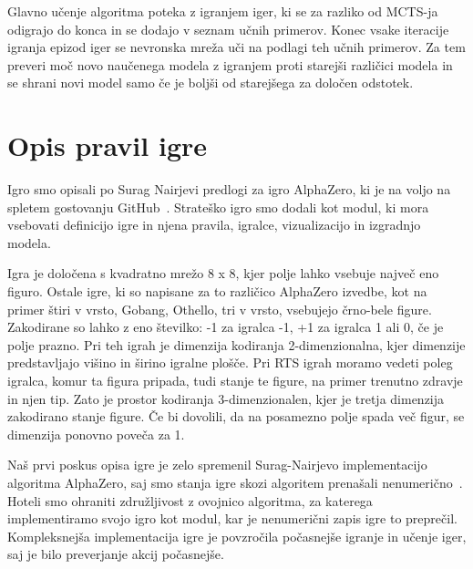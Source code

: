 \documentclass[a4paper, 12pt]{book}
\begin{document}
Glavno učenje algoritma poteka z igranjem iger, ki se za razliko od MCTS-ja odigrajo do konca in se dodajo v seznam učnih primerov.
Konec vsake iteracije igranja epizod iger se nevronska mreža uči na podlagi teh učnih primerov.
Za tem preveri moč novo naučenega modela z igranjem proti starejši različici modela in se shrani novi model samo če je boljši od starejšega za določen odstotek.


\chapter{Opis pravil igre}
\label{chpravilaigre}

Igro smo opisali po Surag Nairjevi predlogi za igro AlphaZero, ki je na voljo na spletem gostovanju GitHub~\cite{alphazerogeneral}.
Strateško igro smo dodali kot modul, ki mora vsebovati definicijo igre in njena pravila, igralce, vizualizacijo in izgradnjo modela.

Igra je določena s kvadratno mrežo 8 x 8, kjer polje lahko vsebuje največ eno figuro.
Ostale igre, ki so napisane za to različico AlphaZero izvedbe, kot na primer štiri v vrsto, Gobang, Othello, tri v vrsto, vsebujejo črno-bele figure.
Zakodirane so lahko z eno številko: -1 za igralca -1, +1 za igralca 1 ali 0, če je polje prazno.
Pri teh igrah je dimenzija kodiranja 2-dimenzionalna, kjer dimenzije predstavljajo višino in širino igralne plošče.
Pri RTS igrah moramo vedeti poleg igralca, komur ta figura pripada, tudi stanje te figure, na primer trenutno zdravje in njen tip.
Zato je prostor kodiranja 3-dimenzionalen, kjer je tretja dimenzija zakodirano stanje figure.
Če bi dovolili, da na posamezno polje spada več figur, se dimenzija ponovno poveča za 1.

Naš prvi poskus opisa igre je zelo spremenil Surag-Nairjevo implementacijo algoritma AlphaZero, saj smo stanja igre skozi algoritem prenašali nenumerično~\cite{objectAlphaZero}.
Hoteli smo ohraniti združljivost z ovojnico algoritma, za katerega implementiramo svojo igro kot modul, kar je nenumerični zapis igre to preprečil.
Kompleksnejša implementacija igre je povzročila počasnejše igranje in učenje iger, saj je bilo preverjanje akcij počasnejše.
\end{document}
